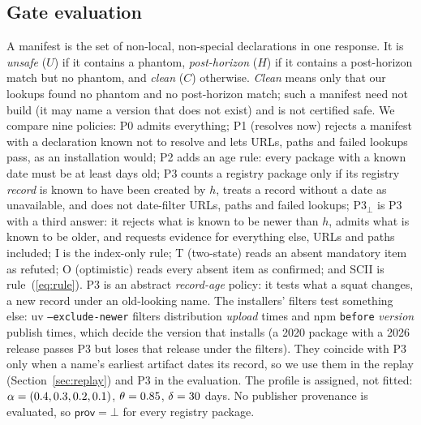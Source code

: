 \documentclass[conference]{IEEEtran}
\newcommand{\sprov}{\mathsf{prov}}
\begin{document}
\subsection{Gate evaluation}
\label{sec:gateeval}
A manifest is the set of non-local, non-special declarations in one response. It is \emph{unsafe} ($U$) if it contains
a phantom, \emph{post-horizon} ($H$) if it contains a post-horizon match but no phantom, and \emph{clean} ($C$)
otherwise. \emph{Clean} means only that our lookups found no phantom and no post-horizon match; such a manifest need
not build (it may name a version that does not exist) and is not certified safe. We compare nine policies:
P0 admits everything;
P1 (resolves now) rejects a manifest with a declaration known not to resolve and lets URLs, paths and failed lookups
pass, as an installation would;
P2 adds an age rule: every package with a known date must be at least \rAgeDays{} days old;
P3 counts a registry package only if its registry \emph{record} is known to have been created by $h$, treats a record
without a date as unavailable, and does not date-filter URLs, paths and failed lookups;
P3$_\bot$ is P3 with a third answer: it rejects what is known to be newer than $h$, admits what is known to be older,
and requests evidence for everything else, URLs and paths included;
I is the index-only rule; T (two-state) reads an absent mandatory item as refuted; O (optimistic) reads every absent
item as confirmed; and SCII is rule~(\ref{eq:rule}). P3 is an abstract \emph{record-age} policy: it tests what a
squat changes, a new record under an old-looking name. The installers' filters test something else: uv
\texttt{--exclude-newer} filters distribution \emph{upload} times and npm \texttt{before} \emph{version} publish
times, which decide the version that installs (a 2020 package with a 2026 release passes P3 but loses that release
under the filters). They coincide with P3 only when a name's earliest artifact dates its record, so we use them in
the replay (Section~\ref{sec:replay}) and P3 in the evaluation.
The profile is assigned, not fitted:
$\alpha=(0.4,0.3,0.2,0.1)$, $\theta=0.85$, $\delta=30$ days. No publisher
provenance is evaluated, so $\sprov=\bot$ for every registry package.
\end{document}

